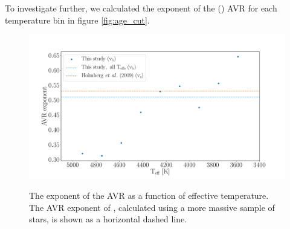 To investigate further, we calculated the exponent of the (\vb) AVR for each
temperature bin in figure \ref{fig:age_cut}.
\begin{figure}
  \caption{
The exponent of the AVR as a function of effective temperature.
    The AVR exponent of \citet{holmberg2009}, calculated using a more massive
    sample of stars, is shown as a horizontal dashed line.
}
  \centering
    \includegraphics[width=1\textwidth]{AVR_exponent}
\label{fig:AVR_exponent}
\end{figure}

